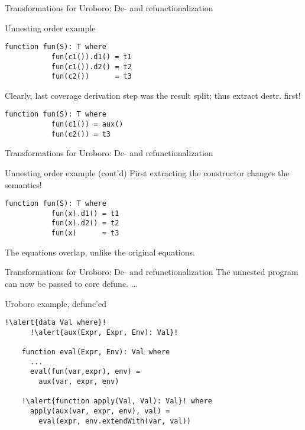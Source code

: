\documentclass[xcolor=svgnames]{beamer}
\begin{document}
\begin{frame}[fragile]
  {Transformations for Uroboro: De- and refunctionalization}

  \begin{block}{Unnesting order example}
    \begin{block}{}
      \begin{lstlisting}[escapechar=!]
         function fun(S): T where
           fun(c1()).d1() = t1
           fun(c1()).d2() = t2
           fun(c2())      = t3
      \end{lstlisting}
    \end{block}
    Clearly, last coverage derivation step was the result split; thus extract destr. first!
    \begin{block}{}
      \begin{lstlisting}[escapechar=!]
         function fun(S): T where
           fun(c1()) = aux()
           fun(c2()) = t3
      \end{lstlisting}
    \end{block}
  \end{block}
\end{frame}

\begin{frame}[fragile]
  {Transformations for Uroboro: De- and refunctionalization}

  \begin{block}{Unnesting order example (cont'd)}
    First extracting the constructor changes the semantics!
    \begin{block}{}
      \begin{lstlisting}[escapechar=!]
         function fun(S): T where
           fun(x).d1() = t1
           fun(x).d2() = t2
           fun(x)      = t3
      \end{lstlisting}
    \end{block}
    The equations overlap, unlike the original equations.
  \end{block}
\end{frame}

\begin{frame}[fragile]
  {Transformations for Uroboro: De- and refunctionalization}
The unnested program can now be passed to core defunc. ...

  \begin{block}{Uroboro example, defunc'ed}
    \begin{lstlisting}[escapechar=!]
    !\alert{data Val where}!
      !\alert{aux(Expr, Expr, Env): Val}!

    function eval(Expr, Env): Val where
      ...
      eval(fun(var,expr), env) =
        aux(var, expr, env)        

    !\alert{function apply(Val, Val): Val}! where
      apply(aux(var, expr, env), val) =
        eval(expr, env.extendWith(var, val))
    \end{lstlisting}
  \end{block}
\end{frame}
\end{document}
